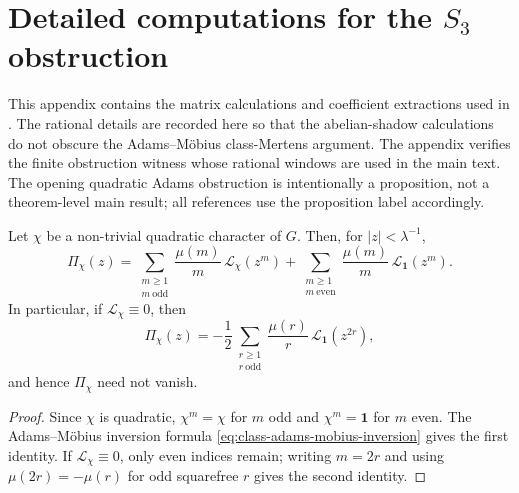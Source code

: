 \section[Detailed computations for the S3 obstruction]{Detailed computations for the \texorpdfstring{$S_3$}{S3} obstruction}
\label{app:s3-model-computations}

This appendix contains the matrix calculations and coefficient extractions
used in . The rational details are recorded here so that the
abelian-shadow calculations do not obscure the Adams--M\"obius class-Mertens
argument.  The appendix verifies the finite obstruction witness whose rational
windows are used in the main text.
The opening quadratic Adams obstruction is intentionally a proposition,
not a theorem-level main result; all references use the proposition label
accordingly.


\begin{proposition}
  \label{prop:quadratic-adams-obstruction}
  Let \(\chi\) be a non-trivial quadratic character of \(G\). Then, for
  \(|z|<\lambda^{-1}\),
  \[
    \Pi_\chi(z)
    =
    \sum_{\substack{m\ge 1\\ m\ \mathrm{odd}}}
      \frac{\mu(m)}{m}\,\mathcal L_\chi(z^m)
    +
    \sum_{\substack{m\ge 1\\ m\ \mathrm{even}}}
      \frac{\mu(m)}{m}\,\mathcal L_{\mathbf 1}(z^m).
  \]
  In particular, if \(\mathcal L_\chi\equiv0\), then
  \[
    \Pi_\chi(z)
    =
    -\frac{1}{2}
      \sum_{\substack{r\ge 1\\ r\ \mathrm{odd}}}
        \frac{\mu(r)}{r}\,
        \mathcal L_{\mathbf 1}(z^{2r}),
  \]
  and hence \(\Pi_\chi\) need not vanish.
\end{proposition}

\begin{proof}
  Since \(\chi\) is quadratic, \(\chi^m=\chi\) for \(m\) odd and
  \(\chi^m=\mathbf1\) for \(m\) even. The Adams--M\"obius inversion
  formula \eqref{eq:class-adams-mobius-inversion} gives the first
  identity. If \(\mathcal L_\chi\equiv0\), only even indices remain;
  writing \(m=2r\) and using \(\mu(2r)=-\mu(r)\) for odd squarefree
  \(r\) gives the second identity.
\end{proof}

